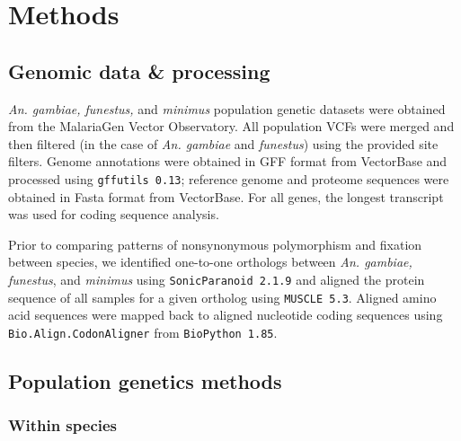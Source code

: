 \section{Methods}

\subsection{Genomic data \& processing} \label{sec:geno}

\textit{An. gambiae, funestus,} and \textit{minimus} population genetic datasets were obtained from the MalariaGen Vector Observatory.
All population VCFs were merged and then filtered (in the case of \textit{An. gambiae} and \textit{funestus}) using the provided site filters. 
Genome annotations were obtained in GFF format from VectorBase and processed using \texttt{gffutils 0.13}; reference genome and proteome sequences were obtained in Fasta format from VectorBase.
For all genes, the longest transcript was used for coding sequence analysis.

Prior to comparing patterns of nonsynonymous polymorphism and fixation between species, we identified one-to-one orthologs between \textit{An. gambiae, funestus}, and \textit{minimus} using \texttt{SonicParanoid 2.1.9} and aligned the protein sequence of all samples for a given ortholog using \texttt{MUSCLE 5.3}. Aligned amino acid sequences were mapped back to aligned nucleotide coding sequences using \texttt{Bio.Align.CodonAligner} from \texttt{BioPython 1.85}.

\subsection{Population genetics methods}

\subsubsection{Within species}

